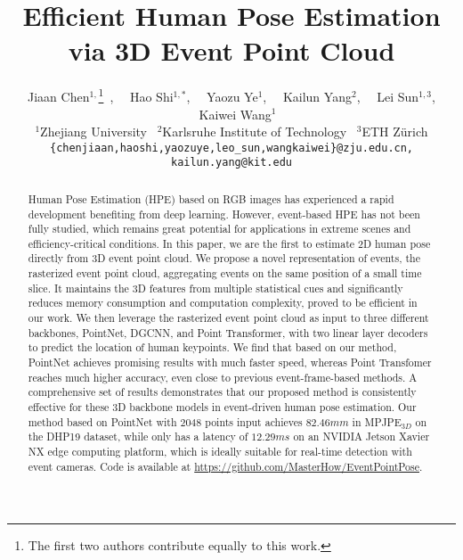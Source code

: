 \documentclass[10pt,twocolumn,letterpaper]{article}
\begin{document}
\title{Efficient Human Pose Estimation via 3D Event Point Cloud}
\author{Jiaan Chen$^{1,}$\thanks{The first two authors contribute equally to this work.}\, ,
~~Hao Shi$^{1,*}$,
~~Yaozu Ye$^1$,
~~Kailun Yang$^2$,
~~Lei Sun$^{1,3}$,
~~Kaiwei Wang$^1$\\
\normalsize
$^1$Zhejiang University
\normalsize
~$^2$Karlsruhe Institute of Technology
\normalsize
~$^3$ETH Z\"urich\\
{\tt\small \{chenjiaan,haoshi,yaozuye,leo\_sun,wangkaiwei\}@zju.edu.cn, kailun.yang@kit.edu}
}

\maketitle

\begin{abstract}
\vspace{-0.75em}
Human Pose Estimation (HPE) based on RGB images has experienced a rapid development benefiting from deep learning. However, event-based HPE has not been fully studied, which remains great potential for applications in extreme scenes and efficiency-critical conditions. In this paper, we are the first to estimate 2D human pose directly from 3D event point cloud. We propose a novel representation of events, the rasterized event point cloud, aggregating events on the same position of a small time slice. It maintains the 3D features from multiple statistical cues and significantly reduces memory consumption and computation complexity, proved to be efficient in our work. We then leverage the rasterized event point cloud as input to three different backbones, PointNet, DGCNN, and Point Transformer, with two linear layer decoders to predict the location of human keypoints. We find that based on our method, PointNet achieves promising results with much faster speed, whereas Point Transfomer reaches much higher accuracy, even close to previous event-frame-based methods. A comprehensive set of results demonstrates that our proposed method is consistently effective for these 3D backbone models in event-driven human pose estimation. Our method based on PointNet with $2048$ points input achieves $82.46mm$ in MPJPE$_{3D}$ on the DHP19 dataset, while only has a latency of $12.29ms$ on an NVIDIA Jetson Xavier NX edge computing platform, which is ideally suitable for real-time detection with event cameras. Code is available at \url{https://github.com/MasterHow/EventPointPose}.
\end{abstract}

\vspace{-1.75em}
\end{document}
